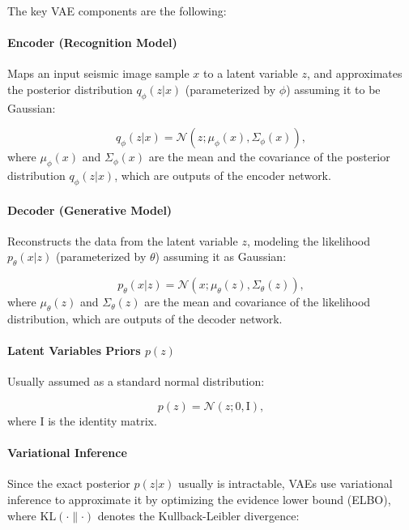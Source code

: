 \documentclass{ieeeaccess}
\begin{document}
The key VAE components are the following:

\paragraph{Encoder (Recognition Model)}
Maps an input seismic image sample $x$ to a latent variable $z$, and approximates the posterior distribution $q_\phi(z | x)$ (parameterized by $\phi$) assuming it to be Gaussian:

\begin{equation}
q_\phi(z | x) = \mathcal{N}(z; \mu_\phi(x), \Sigma_\phi(x)),
\end{equation}
where $\mu_\phi(x)$ and $\Sigma_\phi(x)$ are the mean and the covariance of the posterior distribution $q_\phi(z | x)$, which are outputs of the encoder network.

\paragraph{Decoder (Generative Model)}
Reconstructs the data from the latent variable $z$, modeling the likelihood $p_\theta(x | z)$ (parameterized by $\theta$) assuming it as Gaussian:

\begin{equation}
p_\theta(x | z) = \mathcal{N}(x; \mu_\theta(z), \Sigma_\theta(z)),
\end{equation}
where $\mu_\theta(z)$ and $\Sigma_\theta(z)$ are the mean and covariance of the likelihood distribution, which are outputs of the decoder network.

\paragraph{Latent Variables Priors $p(z)$}
Usually assumed as a standard normal distribution:

\begin{equation}
p(z) = \mathcal{N}(z; 0, \mathrm{I}),
\end{equation}
where $\mathrm{I}$ is the identity matrix.

\paragraph{Variational Inference} 
Since the exact posterior $p(z | x)$ usually is intractable, VAEs use variational inference to approximate it by optimizing the evidence lower bound (ELBO), where $\text{KL}(\cdot \parallel \cdot)$ denotes the Kullback-Leibler divergence:
\end{document}
